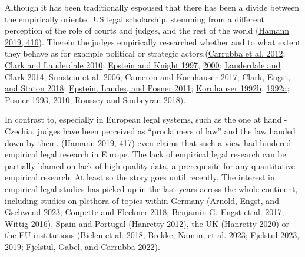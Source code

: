 \documentclass[
  11pt,
]{article}
\begin{document}
Although it has been traditionally espoused that there has been a divide
between the empirically oriented US legal scholarship, stemming from a
different perception of the role of courts and judges, and the rest of
the world (\protect\hyperlink{ref-hamannGermanFederalCourts2019}{Hamann
2019, 416}). Therein the judges empirically researched whether and to
what extent they behave as for example political or strategic
actors.(\protect\hyperlink{ref-carrubbaWhoControlsContent2012}{Carrubba
et al. 2012};
\protect\hyperlink{ref-clarkLocatingSupremeCourt2010}{Clark and
Lauderdale 2010};
\protect\hyperlink{ref-epsteinChoicesJusticesMake1997}{Epstein and
Knight 1997},
\protect\hyperlink{ref-epsteinStrategicRevolutionJudicial2000}{2000};
\protect\hyperlink{ref-lauderdaleScalingPoliticallyMeaningful2014}{Lauderdale
and Clark 2014};
\protect\hyperlink{ref-sunsteinAreJudgesPolitical2006}{Sunstein et al.
2006}; \protect\hyperlink{ref-cameronChapterWhatJudges2017}{Cameron and
Kornhauser 2017};
\protect\hyperlink{ref-clarkEstimatingEffectLeisure2018}{Clark, Engst,
and Staton 2018};
\protect\hyperlink{ref-epsteinWhyWhenJudges2011}{Epstein, Landes, and
Posner 2011};
\protect\hyperlink{ref-kornhauserModelingCollegialCourts1992}{Kornhauser
1992b},
\protect\hyperlink{ref-kornhauserModelingCollegialCourts1992a}{1992a};
\protect\hyperlink{ref-posnerWhatJudgesJustices1993}{Posner 1993},
\protect\hyperlink{ref-posnerHowJudgesThink2010}{2010};
\protect\hyperlink{ref-rousseyOverburdenedJudges2018}{Roussey and
Soubeyran 2018}).

In contrast to, especially in European legal systems, such as the one at
hand - Czechia, judges have been perceived as ``proclaimers of law'' and
the law handed down by them.
(\protect\hyperlink{ref-hamannGermanFederalCourts2019}{Hamann 2019,
417}) even claims that such a view had hindered empirical legal research
in Europe. The lack of empirical legal research can be partially blamed
on lack of high quality data, a prerequisite for any quantitative
empirical research. At least so the story goes until recently. The
interest in empirical legal studies has picked up in the last years
across the whole continent, including studies on plethora of topics
within Germany
(\protect\hyperlink{ref-arnoldScalingCourtDecisions2023}{Arnold, Engst,
and Gschwend 2023};
\protect\hyperlink{ref-coupetteQuantitativeRechtswissenschaft2018}{Coupette
and Fleckner 2018};
\protect\hyperlink{ref-engstEinflussParteinaheAuf2017}{Benjamin G. Engst
et al. 2017};
\protect\hyperlink{ref-wittigOccurrenceSeparateOpinions2016}{Wittig
2016}), Spain and Portugal
(\protect\hyperlink{ref-hanrettyDissentIberiaIdeal2012}{Hanretty 2012}),
the UK
(\protect\hyperlink{ref-hanrettyCourtSpecialistsJudicial2020}{Hanretty
2020}) or the EU institutions
(\protect\hyperlink{ref-bielenBacklogsLitigationRates2018}{Bielen et al.
2018}; \protect\hyperlink{ref-brekkeThatOrderHow2023}{Brekke, Naurin, et
al. 2023}; \protect\hyperlink{ref-fjelstulHowChamberSystem2023}{Fjelstul
2023}, \protect\hyperlink{ref-fjelstulEvolutionEuropeanUnion2019}{2019};
\protect\hyperlink{ref-fjelstulTimelyAdministrationJustice2022}{Fjelstul,
Gabel, and Carrubba 2022}).
\end{document}
